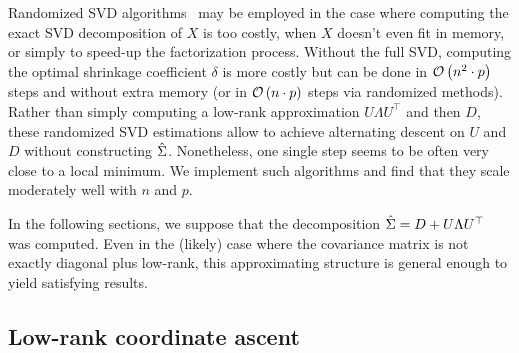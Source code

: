 Randomized SVD algorithms~\citep{random_svd} may be employed
in the case where computing the exact SVD decomposition of $X$ is too costly,
when $X$ doesn't even fit in memory,
or simply to speed-up the factorization process.
Without the full SVD, computing the optimal shrinkage coefficient $\delta$ is more costly
but can be done in $\mathcal{O}\left( n^2 \cdot p \right)$ steps and without extra memory
(or in $\mathcal{O}\left( n \cdot p \right)$ steps via randomized methods).
Rather than simply computing a low-rank approximation $U \Lambda U^\top$ and then $D$,
these randomized SVD estimations allow to achieve alternating descent on $U$ and $D$ without constructing $\hat{\Sigma}$.
Nonetheless, one single step seems to be often very close to a local minimum.
We implement such algorithms and find that they scale moderately well with $n$ and $p$.

\bigbreak
In the following sections,
we suppose that the decomposition $\hat{\Sigma} = D + U \Lambda U^\top$
was computed.
Even in the (likely) case where the covariance matrix is not exactly diagonal plus low-rank,
this approximating structure is general enough to yield satisfying results.

\subsection{Low-rank coordinate ascent}\label{subsec:low_rank_sdp}

